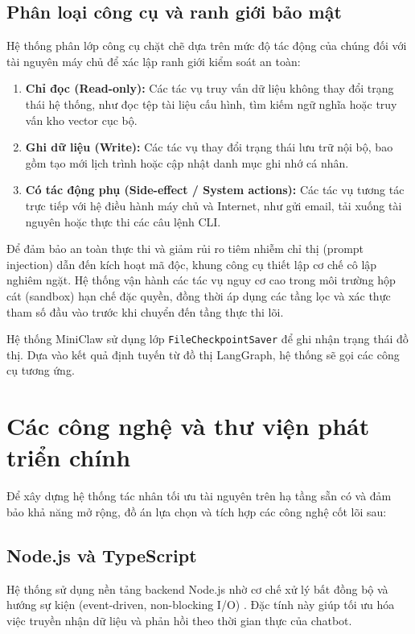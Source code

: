 \subsection{Phân loại công cụ và ranh giới bảo mật}
Hệ thống phân lớp công cụ chặt chẽ dựa trên mức độ tác động của chúng đối với tài nguyên máy chủ để xác lập ranh giới kiểm soát an toàn:
\begin{enumerate}
  \item \textbf{Chỉ đọc (Read-only):} Các tác vụ truy vấn dữ liệu không thay đổi trạng thái hệ thống, như đọc tệp tài liệu cấu hình, tìm kiếm ngữ nghĩa hoặc truy vấn kho vector cục bộ.
  \item \textbf{Ghi dữ liệu (Write):} Các tác vụ thay đổi trạng thái lưu trữ nội bộ, bao gồm tạo mới lịch trình hoặc cập nhật danh mục ghi nhớ cá nhân.
  \item \textbf{Có tác động phụ (Side-effect / System actions):} Các tác vụ tương tác trực tiếp với hệ điều hành máy chủ và Internet, như gửi email, tải xuống tài nguyên hoặc thực thi các câu lệnh CLI.
\end{enumerate}

Để đảm bảo an toàn thực thi và giảm rủi ro tiêm nhiễm chỉ thị (prompt injection) dẫn đến kích hoạt mã độc, khung công cụ thiết lập cơ chế cô lập nghiêm ngặt. Hệ thống vận hành các tác vụ nguy cơ cao trong môi trường hộp cát (sandbox) hạn chế đặc quyền, đồng thời áp dụng các tầng lọc và xác thực tham số đầu vào trước khi chuyển đến tầng thực thi lõi.

Hệ thống MiniClaw sử dụng lớp \texttt{FileCheckpointSaver} để ghi nhận trạng thái đồ thị. Dựa vào kết quả định tuyến từ đồ thị LangGraph, hệ thống sẽ gọi các công cụ tương ứng.

\section{Các công nghệ và thư viện phát triển chính}
Để xây dựng hệ thống tác nhân tối ưu tài nguyên trên hạ tầng sẵn có và đảm bảo khả năng mở rộng, đồ án lựa chọn và tích hợp các công nghệ cốt lõi sau:

\subsection{Node.js và TypeScript}
Hệ thống sử dụng nền tảng backend Node.js nhờ cơ chế xử lý bất đồng bộ và hướng sự kiện (event-driven, non-blocking I/O) \cite{nodejsDocs}. Đặc tính này giúp tối ưu hóa việc truyền nhận dữ liệu và phản hồi theo thời gian thực của chatbot.

